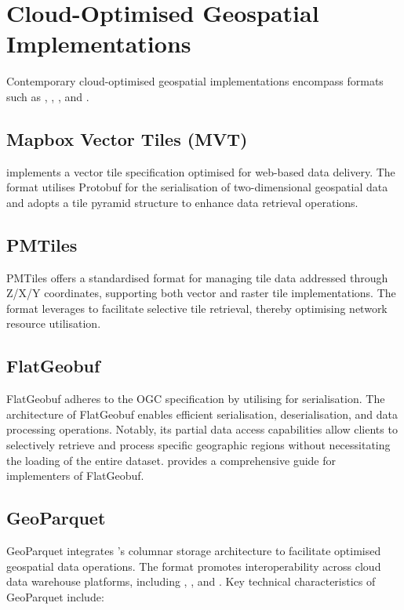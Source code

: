 \section{Cloud-Optimised Geospatial Implementations}
\label{rw:cloud_optimised_implementations}
Contemporary cloud-optimised geospatial implementations encompass formats such as \citet{mapbox-vector-tiles}, \citet{flatgeobuf}, \citet{pmtiles}, and \citet{geoparquet}.

\subsection{Mapbox Vector Tiles (MVT)}
\label{rw:cloud_optimised_implementations:mvt}
\citet{mapbox-vector-tiles} implements a vector tile specification optimised for web-based data delivery. The format utilises Protobuf for the serialisation of two-dimensional geospatial data and adopts a tile pyramid structure to enhance data retrieval operations.

\subsection{PMTiles}
\label{rw:cloud_optimised_implementations:pmtiles}
PMTiles offers a standardised format for managing tile data addressed through Z/X/Y coordinates, supporting both vector and raster tile implementations. The format leverages \citet{http_range_requests} to facilitate selective tile retrieval, thereby optimising network resource utilisation.

\subsection{FlatGeobuf}
\label{rw:cloud_optimised_implementations:flatgeobuf}
FlatGeobuf adheres to the OGC \citet{simple_features} specification by utilising \citet{flatbuffers} for serialisation. The architecture of FlatGeobuf enables efficient serialisation, deserialisation, and data processing operations. Notably, its partial data access capabilities allow clients to selectively retrieve and process specific geographic regions without necessitating the loading of the entire dataset. \citet{horance_2022_detail} provides a comprehensive guide for implementers of FlatGeobuf.

\subsection{GeoParquet}
\label{rw:cloud_optimised_implementations:geoparquet}
GeoParquet integrates \citet{parquet}'s columnar storage architecture to facilitate optimised geospatial data operations. The format promotes interoperability across cloud data warehouse platforms, including \citet{bigquery}, \citet{snowflake}, and \citet{redshift}. Key technical characteristics of GeoParquet include:

